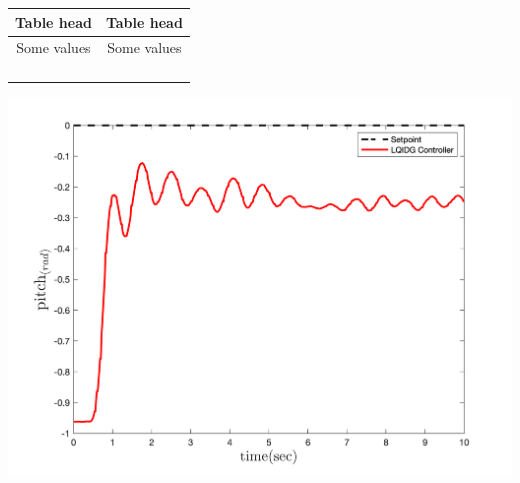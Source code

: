   \begin{minipage}[!ht]{\linewidth}
	\hfill
	\begin{minipage}[b]{0.49\linewidth}
		\centering
		\begin{tabular}{cc}\hline
			Table head & Table head \\ \hline

			Some values & Some values \\ \hline
			\\
			\\
			\\
			\\
			
		\end{tabular}
	\end{minipage}
	\begin{minipage}[b]{0.49\linewidth}
	\centering
	\includegraphics[width=1\linewidth]{../Figures/Calibration/LQR/Pitch/lqr_pitch.png}
\end{minipage}
\end{minipage}

